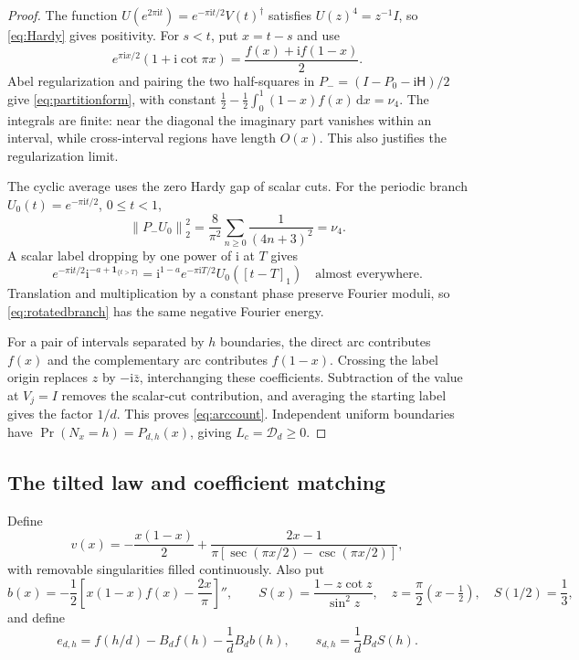 \documentclass[11pt]{amsart}
\theoremstyle{remark}
\theoremstyle{plain}
\numberwithin{equation}{section}
\newcommand{\ii}{\mathrm i}
\newcommand{\dd}{\,\mathrm d}
\newcommand{\ind}{\mathbf 1}
\newcommand{\norm}[1]{\left\|#1\right\|}
\newcommand{\Ddef}{\mathcal D_d}
\newcommand{\Hilb}{\mathsf H}
\begin{document}
\begin{proof}
The function \(U(e^{2\pi\ii t})=e^{-\pi\ii t/2}V(t)^\dagger\)
satisfies \(U(z)^4=z^{-1}I\), so \eqref{eq:Hardy} gives positivity.
For \(s<t\), put \(x=t-s\) and use
\[
 e^{\pi\ii x/2}(1+\ii\cot\pi x)
 =\frac{f(x)+\ii f(1-x)}2.
\]
Abel regularization and pairing the two half-squares in
\(P_-=(I-P_0-\ii\Hilb)/2\) give \eqref{eq:partitionform}, with constant
\(\frac12-\frac12\int_0^1(1-x)f(x)\dd x=\nu_4\).
The integrals are finite: near the diagonal the imaginary part
vanishes within an interval, while cross-interval regions have length
\(O(x)\). This also justifies the regularization limit.

The cyclic average uses the zero Hardy gap of scalar cuts.
For the periodic branch \(U_0(t)=e^{-\pi\ii t/2}\), \(0\le t<1\),
\[
 \norm{P_-U_0}_2^2
 =\frac8{\pi^2}\sum_{n\ge0}\frac1{(4n+3)^2}
 =\nu_4.
\]
A scalar label dropping by one power of \(\ii\) at \(T\) gives
\begin{equation}\label{eq:rotatedbranch}
 e^{-\pi\ii t/2}\ii^{-a+\ind_{\{t>T\}}}
 =
 \ii^{1-a}e^{-\pi\ii T/2}U_0([t-T]_1)
 \quad\text{almost everywhere}.
\end{equation}
Translation and multiplication by a constant phase preserve Fourier
moduli, so \eqref{eq:rotatedbranch} has the same negative Fourier
energy.

For a pair of intervals separated by \(h\) boundaries, the direct arc
contributes \(f(x)\) and the complementary arc contributes \(f(1-x)\).
Crossing the label origin replaces \(z\) by \(-\ii\bar z\), interchanging
these coefficients. Subtraction of the value at \(V_j=I\) removes
the scalar-cut contribution, and averaging the starting label gives
the factor \(1/d\). This proves \eqref{eq:arccount}.
Independent uniform boundaries have
\(\Pr(N_x=h)=P_{d,h}(x)\), giving \(L_c=\Ddef\ge0\).
\end{proof}

\subsection{The tilted law and coefficient matching}

Define
\begin{equation}\label{eq:vkernel}
 v(x)=-\frac{x(1-x)}2+
 \frac{2x-1}{\pi[\sec(\pi x/2)-\csc(\pi x/2)]},
\end{equation}
with removable singularities filled continuously.
Also put
\[
 b(x)=-\frac12\left[x(1-x)f(x)-\frac{2x}{\pi}\right]'',
 \qquad
 S(x)=\frac{1-z\cot z}{\sin^2z},\quad
 z=\frac\pi2(x-\tfrac12),\quad S(1/2)=\frac13,
\]
and define
\begin{equation}\label{eq:es}
 e_{d,h}=f(h/d)-B_df(h)-\frac1dB_db(h),\qquad
 s_{d,h}=\frac1dB_dS(h).
\end{equation}
\end{document}

